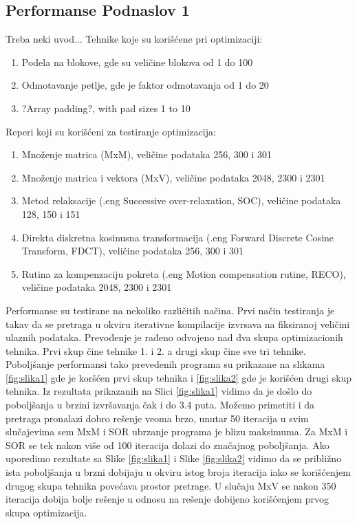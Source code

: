 \documentclass[a4paper]{article}
\begin{document}
{\subsection{Performanse Podnaslov 1}
\label{sec:perpod1}
    Treba neki uvod...
\newline Tehnike koje su korišćene pri optimizaciji:
\begin{enumerate}
\item Podela na blokove, gde su veličine blokova od 1 do 100
\item Odmotavanje petlje, gde je faktor odmotavanja od 1 do 20
\item ?Array padding?, with pad sizes 1 to 10
\end{enumerate}
Reperi koji su korišćeni za testiranje optimizacija:
\begin{enumerate}
\item Množenje matrica (MxM), veličine podataka 256, 300 i 301
\item Množenje matrica i vektora (MxV), veličine podataka 2048, 2300 i 2301 
\item Metod relaksacije (.eng Successive over-relaxation, SOC), veličine podataka 128, 150 i 151
\item Direkta diskretna kosinusna transformacija (.eng Forward Discrete Cosine Transform, FDCT), veličine podataka 256, 300 i 301
\item Rutina za kompenzaciju pokreta (.eng Motion compensation rutine, RECO), veličine podataka 2048, 2300 i 2301
\end{enumerate}
    Performanse su testirane na nekoliko različitih načina. 
Prvi način testiranja je takav da se pretraga u okviru iterativne kompilacije izvrsava na 
fiksiranoj veličini ulaznih podataka. Prevođenje je rađeno odvojeno nad dva skupa
optimizacionih tehnika. Prvi skup čine tehnike 1. i 2. a drugi skup čine sve tri tehnike. Poboljšanje performansi 
tako prevedenih programa su prikazane na slikama \ref{fig:slika1} gde je koršćen prvi skup tehnika i 
\ref{fig:slika2} gde je korišćen drugi skup tehnika. Iz rezultata prikazanih na Slici \ref{fig:slika1} vidimo da
je došlo do poboljšanja u brzini izvršavanja čak i do 3.4 puta. Možemo primetiti i da pretraga pronalazi 
dobro rešenje veoma brzo, unutar 50 iteracija u svim slučajevima sem MxM i SOR
ubrzanje programa je blizu maksimuma. Za MxM i SOR se tek nakon više od 100 iteracija dolazi do značajnog poboljšanja.
Ako uporedimo rezultate sa Slike \ref{fig:slika1} i Slike \ref{fig:slika2} vidimo da se približno ista poboljšanja
u brzni dobijaju u okviru istog broja iteracija iako se korišćenjem drugog skupa tehnika povećava prostor pretrage.
U slučaju MxV se nakon 350 iteracija dobija bolje rešenje u odnosu na rešenje dobijeno korišćenjem prvog skupa optimizacija.

}
\end{document}
